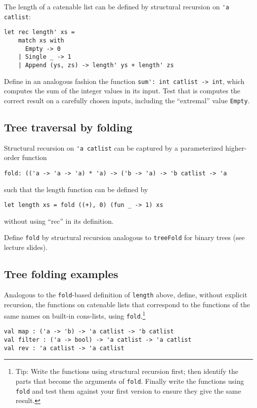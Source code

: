 The length of a catenable list can be defined by structural recursion on \verb|'a catlist|:
\begin{verbatim}
let rec length' xs =
    match xs with
      Empty -> 0
    | Single _ -> 1
    | Append (ys, zs) -> length' ys + length' zs
\end{verbatim}

Define in an analogous fashion the function \verb|sum': int catlist -> int|, which computes the sum of the integer values in its
input. Test that is computes the correct result on a carefully chosen inputs, including the ``extremal'' value \verb|Empty|.

\subsection*{Tree traversal by folding}

Structural recursion on \verb|'a catlist| can be captured by a parameterized higher-order function
\begin{verbatim}
fold: (('a -> 'a -> 'a) * 'a) -> ('b -> 'a) -> 'b catlist -> 'a
\end{verbatim}
such that the length function can be defined by
\begin{verbatim}
let length xs = fold ((+), 0) (fun _ -> 1) xs
\end{verbatim}
without using ``rec'' in its definition.

Define \verb|fold| by structural recursion analogous to \verb|treeFold| for binary trees (see lecture slides).

\subsection*{Tree folding examples}

Analogous to the \verb|fold|-based definition of \verb|length| above, define, without explicit recursion, the functions on catenable lists that correspond to the functions of the same names on built-in cons-lists, using \verb|fold|.\footnote{Tip: Write the functions using structural recursion first; then identify the parts that become the arguments of \texttt{fold}. Finally write the functions using \texttt{fold} and test them against your first version to ensure they give the same result.}  
\begin{verbatim}
val map : ('a -> 'b) -> 'a catlist -> 'b catlist 
val filter : ('a -> bool) -> 'a catlist -> 'a catlist 
val rev : 'a catlist -> 'a catlist
\end{verbatim}

